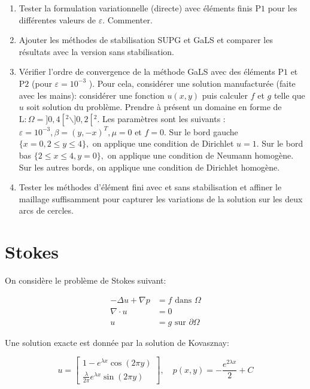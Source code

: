\documentclass[11pt,utf8]{article}
\begin{document}
\begin{enumerate}
  \item Tester la formulation variationnelle (directe) avec éléments finis $\mathrm{P} 1$ pour les différentes valeurs de $\varepsilon$. Commenter.
  \item Ajouter les méthodes de stabilisation SUPG et GaLS et comparer les résultats avec la version sans stabilisation.
  \item Vérifier l'ordre de convergence de la méthode GaLS avec des éléments $\mathrm{P} 1$ et $\mathrm{P} 2$ (pour $\varepsilon=10^{-3}$ ). 
  Pour cela, considérer une solution manufacturée (faite avec les mains): considérer une fonction $u(x, y)$ puis calculer $f$ et $g$ telle que $u$ soit solution du problème. 
  Prendre à présent un domaine en forme de $\mathrm{L}: \Omega=] 0,4\left[^2 \backslash ] 0,2\left[ ^2.\right.\right.$ 
  Les paramètres sont les suivants : $\varepsilon=10^{-3}, \beta=(y,-x)^{T}, \mu=0$ et $f=0 .$ 
  Sur le bord gauche $\{x=0,2 \leqslant y \leqslant 4\},$ on applique une condition de Dirichlet $u=1$. 
  Sur le bord bas $\{2 \leqslant x \leqslant 4, y=0\},$ on applique une condition de Neumann homogène. 
  Sur les autres bords, on applique une condition de Dirichlet homogène.
  \item Tester les méthodes d'élément fini avec et sans stabilisation et affiner le maillage suffisamment pour capturer les variations de la solution sur les deux arcs de cercles.  
\end{enumerate}
\section[]{Stokes}

On considère le problème de Stokes suivant:

$$\begin{aligned} -\Delta u+\nabla p &=f \text{ dans } \Omega \\ \nabla \cdot u &=0 \\ u&=g \text{ sur } \partial \Omega \end{aligned}$$

Une solution exacte est donnée par la solution de Kovasznay:

$$u=\left[\begin{array}{c} 1-e^{\lambda x} \cos (2 \pi y) \\ \frac{\lambda}{2 \pi} e^{\lambda x} \sin (2 \pi y) \end{array}\right], \quad p(x, y)=-\frac{e^{2 \lambda x}}{2}+C$$
\end{document}
